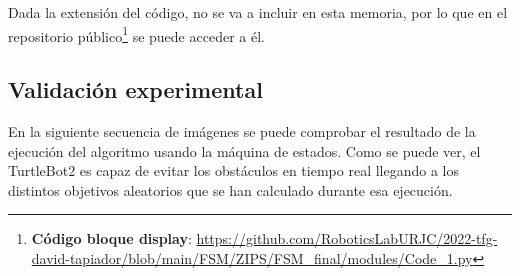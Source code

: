 Dada la extensión del código, no se va a incluir en esta memoria, por lo que en el repositorio
público\footnote{\textbf{Código bloque display}: \url{https://github.com/RoboticsLabURJC/2022-tfg-david-tapiador/blob/main/FSM/ZIPS/FSM_final/modules/Code_1.py}}
se puede acceder a él.

\newpage

\subsection{Validación experimental}
\label{subsec:val_exp_FSM}

En la siguiente secuencia de imágenes se puede comprobar el resultado de la ejecución del algoritmo usando la máquina de estados. Como se puede ver, el TurtleBot2 es capaz de
evitar los obstáculos en tiempo real llegando a los distintos objetivos aleatorios que se han calculado durante esa ejecución.

